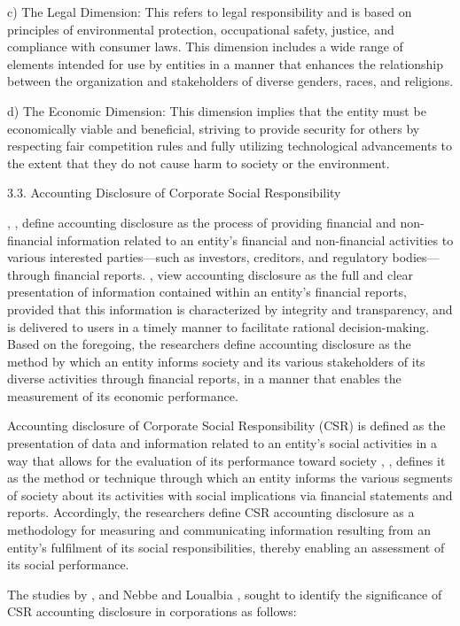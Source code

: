 \documentclass{default}
\begin{document}
c) The Legal Dimension: This refers to legal responsibility and is based on principles of environmental protection, occupational safety, justice, and compliance with consumer laws. This dimension includes a wide range of elements intended for use by entities in a manner that enhances the relationship between the organization and stakeholders of diverse genders, races, and religions.

d) The Economic Dimension: This dimension implies that the entity must be economically viable and beneficial, striving to provide security for others by respecting fair competition rules and fully utilizing technological advancements to the extent that they do not cause harm to society or the environment.

3.3. Accounting Disclosure of Corporate Social Responsibility

\cite{ref36} , \cite{ref30}, define accounting disclosure as the process of providing financial and non-financial information related to an entity's financial and non-financial activities to various interested parties—such as investors, creditors, and regulatory bodies—through financial reports. \cite{ref9}, view accounting disclosure as the full and clear presentation of information contained within an entity's financial reports, provided that this information is characterized by integrity and transparency, and is delivered to users in a timely manner to facilitate rational decision-making. Based on the foregoing, the researchers define accounting disclosure as the method by which an entity informs society and its various stakeholders of its diverse activities through financial reports, in a manner that enables the measurement of its economic performance.

Accounting disclosure of Corporate Social Responsibility (CSR) is defined as the presentation of data and information related to an entity's social activities in a way that allows for the evaluation of its performance toward society \cite{ref21}, \cite{ref22}, defines it as the method or technique through which an entity informs the various segments of society about its activities with social implications via financial statements and reports. Accordingly, the researchers define CSR accounting disclosure as a methodology for measuring and communicating information resulting from an entity’s fulfilment of its social responsibilities, thereby enabling an assessment of its social performance.

The studies by \cite{ref23}, and Nebbe and Loualbia \cite{ref24}, sought to identify the significance of CSR accounting disclosure in corporations as follows:
\end{document}

